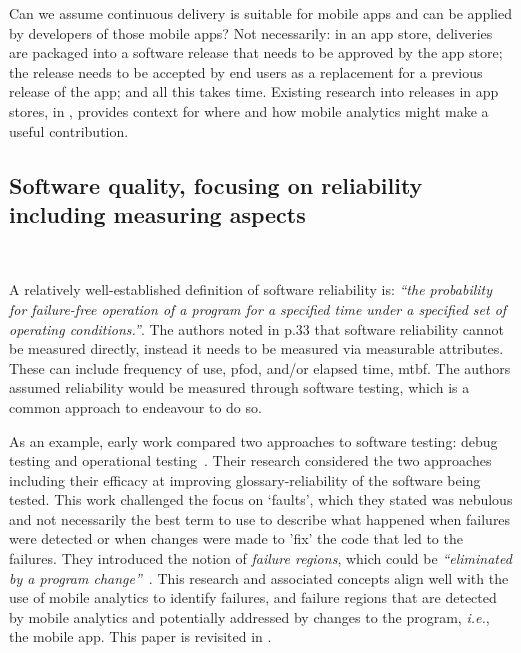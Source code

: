 Can we assume continuous delivery is suitable for mobile apps and can be applied by developers of those mobile apps? Not necessarily: in an app store, deliveries are packaged into a software release that needs to be approved by the app store; the release needs to be accepted by end users as a replacement for a previous release of the app; and all this takes time. Existing research into releases in app stores, in , provides context for where and how mobile analytics might make a useful contribution.


\subsection{Software quality, focusing on reliability including measuring aspects}~\label{rw-software-quality-including-measurement-topic}

A relatively well-established definition of software reliability is: \emph{``the probability for failure-free operation of a program for a specified time under a specified set of operating conditions.''}. The authors noted in p.33 that software reliability cannot be measured directly, instead it needs to be measured via measurable attributes. These can include frequency of use, \acrfull{pfod}, and/or elapsed time, \acrfull{mtbf}. The authors assumed reliability would be measured through software testing, which is a common approach to endeavour to do so.

As an example, early work compared two approaches to software testing: debug testing and operational testing~. Their research considered the two approaches including their efficacy at improving \gls{glossary-reliability} of the software being tested. This work challenged the focus on `faults', which they stated was nebulous and not necessarily the best term to use to describe what happened when failures were detected or when changes were made to 'fix' the code that led to the failures. They introduced the notion of \emph{failure regions}, which could be \emph{``eliminated by a program change''}~. This research and associated concepts align well with the use of mobile analytics to identify failures, and failure regions that are detected by mobile analytics and potentially addressed by changes to the program, \emph{i.e.}, the mobile app. This paper is revisited in .

